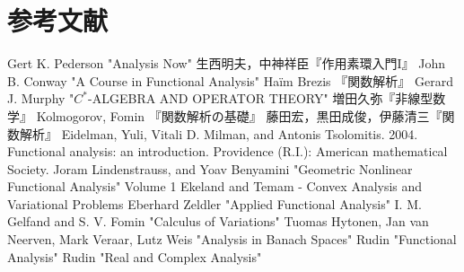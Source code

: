 \documentclass[uplatex,dvipdfmx]{jsreport}
\begin{document}
\chapter{参考文献}

\begin{thebibliography}{99}
    Gert K. Pederson "Analysis Now"
    生西明夫，中神祥臣『作用素環入門I』
    John B. Conway "A Course in Functional Analysis"
    Haïm Brezis 『関数解析』
    Gerard J. Murphy "$C^*$-ALGEBRA AND OPERATOR THEORY"
    増田久弥『非線型数学』
    Kolmogorov, Fomin 『関数解析の基礎』
    藤田宏，黒田成俊，伊藤清三『関数解析』
    Eidelman, Yuli, Vitali D. Milman, and Antonis Tsolomitis. 2004. Functional analysis: an introduction. Providence (R.I.): American mathematical Society.
    Joram Lindenstrauss, and Yoav Benyamini "Geometric Nonlinear Functional Analysis" Volume 1
    Ekeland and Temam -  Convex Analysis and Variational Problems
    Eberhard Zeldler "Applied Functional Analysis"
    I. M. Gelfand and S. V. Fomin "Calculus of Variations"
    Tuomas Hytonen, Jan van Neerven, Mark Veraar, Lutz Weis "Analysis in Banach Spaces"
    Rudin "Functional Analysis"
    Rudin "Real and Complex Analysis"
\end{thebibliography}
\end{document}
